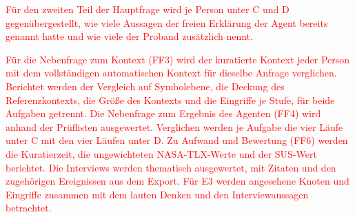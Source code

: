 \textcolor{red}{Für den zweiten Teil der Hauptfrage wird je Person unter C und D gegenübergestellt, wie viele Aussagen der freien Erklärung der Agent bereits genannt hatte und wie viele der Proband zusätzlich nennt.}

\textcolor{red}{Für die Nebenfrage zum Kontext (FF3) wird der kuratierte Kontext jeder Person mit dem vollständigen automatischen Kontext für dieselbe Anfrage verglichen. Berichtet werden der Vergleich auf Symbolebene, die Deckung des Referenzkontexts, die Größe des Kontexts und die Eingriffe je Stufe, für beide Aufgaben getrennt. Die Nebenfrage zum Ergebnis des Agenten (FF4) wird anhand der Prüflisten ausgewertet. Verglichen werden je Aufgabe die vier Läufe unter C mit den vier Läufen unter D. Zu Aufwand und Bewertung (FF6) werden die Kuratierzeit, die ungewichteten NASA-TLX-Werte und der SUS-Wert berichtet. Die Interviews werden thematisch ausgewertet, mit Zitaten und den zugehörigen Ereignissen aus dem Export. Für E3 werden angesehene Knoten und Eingriffe zusammen mit dem lauten Denken und den Interviewaussagen betrachtet.}

